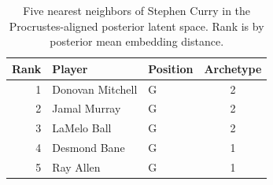 \begin{table}[htbp]
  \centering\small
  \begin{tabular}{rllc}
    \toprule
    Rank & Player & Position & Archetype \\
    \midrule
    1 & Donovan Mitchell & G & 2 \\
    2 & Jamal Murray & G & 2 \\
    3 & LaMelo Ball & G & 2 \\
    4 & Desmond Bane & G & 1 \\
    5 & Ray Allen & G & 1 \\
    \bottomrule
  \end{tabular}
  \caption{Five nearest neighbors of Stephen Curry in the Procrustes-aligned posterior latent space. Rank is by posterior mean embedding distance.}
  \label{tab:Stephen_Curry_neighbors}
\end{table}

